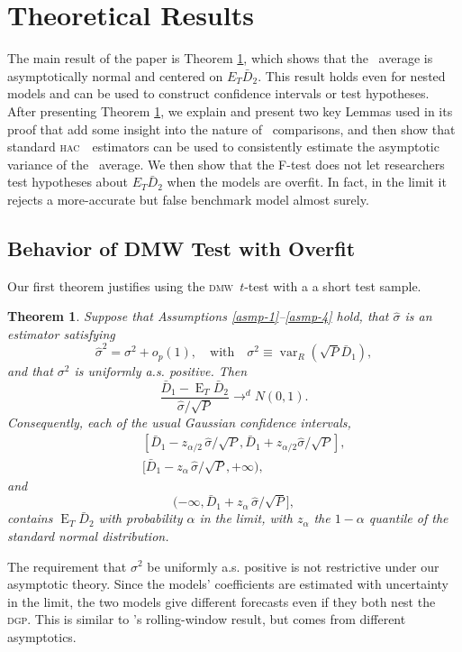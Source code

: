 \documentclass[11pt]{article}
\newtheorem{thm}{Theorem}[section]
\DeclareMathOperator{\E}{E}
\DeclareMathOperator{\var}{var}
\newcommand{\citepos}[1]{\citeauthor{#1}'s \citeyearpar{#1}}
\newcommand{\dmw}{\textsc{dmw}}
\newcommand{\dgp}{\textsc{dgp}}
\newcommand{\hac}{\textsc{hac}}
\begin{document}
\section{Theoretical Results}\label{sec:theory}
The main result of the paper is Theorem
\ref{res-confidence-intervals}, which shows that the \oos\ average is
asymptotically normal and centered on $E_T \bar D_2$.  This result
holds even for nested models and can be used to construct confidence
intervals or test hypotheses.  After presenting Theorem
\ref{res-confidence-intervals}, we explain and present two key Lemmas
used in its proof that add some insight into the nature of \oos\
comparisons, and then show that standard \hac\ \oos\ estimators can be
used to consistently estimate the asymptotic variance of the \oos\
average.  We then show that the F-test does not let researchers test
hypotheses about $E_{T} \bar D_2$ when the models are overfit.  In
fact, in the limit it rejects a more-accurate but false benchmark
model almost surely.

\subsection{Behavior of DMW Test with Overfit}\label{sec:oostheory}
Our first theorem justifies using the \dmw\ $t$-test with a a short
test sample.

\begin{thm}\label{res-confidence-intervals}
  Suppose that Assumptions \ref{asmp-1}--\ref{asmp-4} hold, that
  $\hat\sigma$ is an estimator satisfying
  \[
    \hat\sigma^2 = \sigma^2 + o_p(1), \quad \text{with}\quad 
    \sigma^2 \equiv \var_R(\sqrt{P} \bar D_1),
  \]
  and that $\sigma^2$ is uniformly a.s. positive.  Then
  \[
  \frac{\bar{D}_1 - \E_T\bar{D}_2}{\hat\sigma / \sqrt{P}}
  \to^d N(0,1).
  \]
  Consequently, each of the usual Gaussian confidence intervals,
  \begin{eqnarray}
  &&[\bar{D}_1 - z_{\alpha/2} \, \hat\sigma /
      \sqrt{P}, \bar{D}_1 + z_{\alpha/2} \hat\sigma / \sqrt{P}],\label{interval-twosided} \\
  &&[\bar{D}_1 - z_{\alpha} \, \hat\sigma / \sqrt{P}, +\infty), \label{interval-greater}
  \end{eqnarray}
  and
  \begin{equation} (-\infty, \bar{D}_1 + z_{\alpha}
      \, \hat\sigma / \sqrt{P}],
  \end{equation}
  contains $\E_T\bar{D}_2$ with probability $\alpha$ in the limit,
  with $z_{\alpha}$ the $1-\alpha$ quantile of the standard normal
  distribution.
\end{thm}
The requirement that $\sigma^2$ be uniformly a.s. positive is not
restrictive under our asymptotic theory.  Since the models'
coefficients are estimated with uncertainty in the limit, the two
models give different forecasts even if they both nest the \dgp.  This
is similar to \citepos{GiW:06} rolling-window result, but comes from
different asymptotics.
\end{document}
